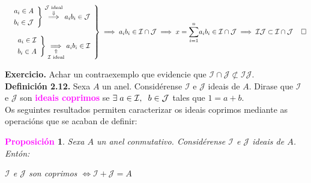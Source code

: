\documentclass[twoside]{report}
\newcommand{\magbf}[1]{\textcolor{magenta}{\textbf{#1}}} %
\theoremstyle{mystyle}
\newtheorem{prop}{\magbf{Proposición}}[chapter]
\newenvironment{proposition}
{\begin{mdframed}[linecolor = magenta,backgroundcolor = classicrose, linewidth = 2mm]\begin{prop}}
{\end{prop}\end{mdframed}}
\begin{document}
$$
\left. \begin{array}{r} 
\left. \begin{array}{r} 
a_{i} \in A\\[1ex]
b_{i} \in \mathcal{J}
\end{array} \right\} 
\overset{\mathcal{J} \text{ ideal}}{\overset{\Downarrow}{\implies}} a_{i}b_{i} \in \mathcal{J} \\
\\
\left. \begin{array}{r}
a_{i} \in \mathcal{I}\\[1ex]
b_{i} \in A
\end{array} \right\} 
\underset{\mathcal{I} \text{ ideal}}{\underset{\Uparrow}{\implies}} a_{i}b_{i} \in \mathcal{I}
\end{array} \right\} 
\implies a_{i}b_{i} \in \mathcal{I \cap J} \implies x = \underset{i = 1}{\overset{n}{\sum}}a_{i}b_{i} \in \mathcal{I \cap J} \implies \mathcal{IJ} \subset \mathcal{I \cap J} \hspace{4mm} \square 
$$

\vspace{3mm}

\noindent \textbf{Exercicio.} Achar un contraexemplo que evidencie que $\mathcal{I \cap J} \not\subset \mathcal{IJ}$.\\

\noindent \textbf{Definición 2.12.} Sexa $A$ un anel. Considérense $\mathcal{I}$ e $\mathcal{J}$ ideais de $A$. Dirase que $\mathcal{I}$ e $\mathcal{J}$ son \magbf{ideais coprimos} se $\exists \hspace{1mm} a \in \mathcal{I}, \hspace{2mm} b \in \mathcal{J}$ tales que $1 = a + b$.\\

\noindent Os seguintes resultados permiten caracterizar os ideais coprimos mediante as operacións que se acaban de definir:\\

\begin{proposition} \label{prop2.5}
Sexa $A$ un anel conmutativo. Considérense $\mathcal{I}$ e $\mathcal{J}$ ideais de $A$. Entón:
\begin{center}
    $\mathcal{I}$ e $\mathcal{J}$ son coprimos $\Longleftrightarrow \mathcal{I + J} = A$  
\end{center}
\end{proposition}

\vspace{2mm}
\end{document}
